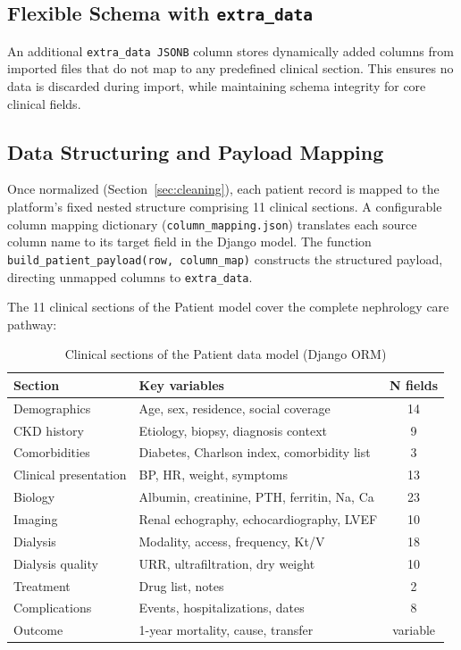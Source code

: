 \documentclass[12pt,a4paper,twoside]{report}
\begin{document}
\subsection{Flexible Schema with \texttt{extra\_data}}

An additional \texttt{extra\_data JSONB} column stores dynamically added columns from imported files that do not map to any predefined clinical section. This ensures no data is discarded during import, while maintaining schema integrity for core clinical fields.

\subsection{Data Structuring and Payload Mapping}\label{sec:structuring}

Once normalized (Section~\ref{sec:cleaning}), each patient record is mapped to the platform's fixed nested structure comprising 11 clinical sections. A configurable column mapping dictionary (\texttt{column\_mapping.json}) translates each source column name to its target field in the Django model. The function \texttt{build\_patient\_payload(row, column\_map)} constructs the structured payload, directing unmapped columns to \texttt{extra\_data}.

The 11 clinical sections of the Patient model cover the complete nephrology care pathway:

\begin{table}[htbp]
\centering
\caption{Clinical sections of the Patient data model (Django ORM)}
\label{tab:patient_sections}
\begin{tabularx}{\textwidth}{p{3.5cm}Xc}
\toprule
\textbf{Section} & \textbf{Key variables} & \textbf{N fields} \\
\midrule
Demographics & Age, sex, residence, social coverage & 14 \\
CKD history & Etiology, biopsy, diagnosis context & 9 \\
Comorbidities & Diabetes, Charlson index, comorbidity list & 3 \\
Clinical presentation & BP, HR, weight, symptoms & 13 \\
Biology & Albumin, creatinine, PTH, ferritin, Na, Ca & 23 \\
Imaging & Renal echography, echocardiography, LVEF & 10 \\
Dialysis & Modality, access, frequency, Kt/V & 18 \\
Dialysis quality & URR, ultrafiltration, dry weight & 10 \\
Treatment & Drug list, notes & 2 \\
Complications & Events, hospitalizations, dates & 8 \\
Outcome & 1-year mortality, cause, transfer & variable \\
\bottomrule
\end{tabularx}
\end{table}
\end{document}
